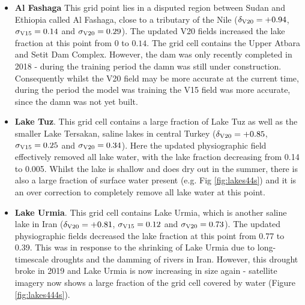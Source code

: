 \documentclass[hess, twostagejnl]{copernicus}
\begin{document}
\begin{itemize}
	\item \textbf{Al Fashaga} This grid point lies in a disputed region between Sudan and Ethiopia called Al Fashaga, close to a tributary of the Nile ($\delta_{\rm V20} = +0.94$, $\sigma_{\rm V15} = 0.14$ and $\sigma_{\rm V20}=0.29$). The updated V20 fields increased the lake fraction at this point from $0$ to $0.14$. The grid cell contains the Upper Atbara and Setit Dam Complex. However, the dam was only recently completed in 2018 - during the training period the damn was still under construction. Consequently whilst the V20 field may be more accurate at the current time, during the period the model was training the V15 field was more accurate, since the damn was not yet built. 
		
	\item \textbf{Lake Tuz}. This grid cell contains a large fraction of Lake Tuz as well as the smaller Lake Tersakan, saline lakes in central Turkey ($\delta_{\rm V20} = +0.85$,$\sigma_{\rm V15} = 0.25$ and $\sigma_{\rm V20}=0.34$). Here the updated physiographic field effectively removed all lake water, with the lake fraction decreasing from 0.14 to 0.005. Whilst the lake is shallow and does dry out in the summer, there is also a large fraction of surface water present (e.g. Fig \ref{fig:lakes44s}) and it is an over correction to completely remove all lake water at this point.
	
	\item \textbf{Lake Urmia}. This grid cell contains Lake Urmia, which is another saline lake in Iran ($\delta_{\rm V20} = +0.81$, $\sigma_{\rm V15} = 0.12$ and $\sigma_{\rm V20}=0.73$). The updated physiographic fields decreased the lake fraction at this point from 0.77 to 0.39. This was in response to the shrinking of Lake Urmia due to long-timescale droughts and the damming of rivers in Iran. However, this drought broke in 2019 and Lake Urmia is now increasing in size again - satellite imagery now shows a large fraction of the grid cell covered by water (Figure \ref{fig:lakes444s}).
\end{itemize}
\end{document}
